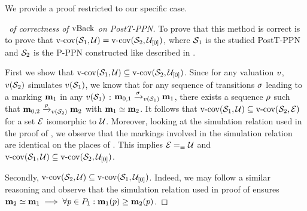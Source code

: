 We provide a proof restricted to our specific case.

\begin{proof}[\proofname\ of correctness of $\vback$ on PostT-PPN]
  To prove that this method is correct is to prove that $\vcov{\namePPN[1]}{\ucs} = \vcov{\namePPN[2]}{\ucse}$,
  where $\namePPN[1]$ is the studied PostT-PPN and $\namePPN[2]$ is the P-PPN constructed like described in .

  First we show that $\vcov{\namePPN[1]}{\ucs} \subseteq \vcov{\namePPN[2]}{\ucse}$.
  Since
  for any valuation $\val$,
  $\val[{\namePPN[2]}]$ simulates $\val[{\namePPN[1]}]$,
  we know that
  for any sequence of transitions $\seqt[1]$
  leading to a marking $\mar_1$ in any $\val[{\namePPN[1]}]$
  :
  $\mar_{0,1} \fire[{\val[{\namePPN[1]}]}]{\seqt[1]} \mar_1$,
  there exists a sequence $\seqt[2]$
  such that
  $\mar_{0,2} \fire[{\val[{\namePPN[2]}]}]{\seqt[2]} \mar_2$
  with $\mar_1 \simeq \mar_2$.
  It follows that $\vcov{\namePPN[1]}{\ucs} \subseteq \vcov{\namePPN[2]}{\set}$ for a set $\set$ isomorphic to $\ucs$.
  Moreover, looking at the simulation relation used in the proof of , we observe that the markings involved in the simulation relation are identical on the places of \namePPN[1].
  This implies $\set =_\equiv \ucs$
  and $\vcov{\namePPN[1]}{\ucs} \subseteq \vcov{\namePPN[2]}{\ucse}$.

  Secondly, $\vcov{\namePPN[2]}{\ucs} \subseteq \vcov{\namePPN[1]}{\ucse}$.
  Indeed,
  we may follow a similar reasoning and observe that
  the simulation relation used in proof of  ensures
  $\mar_2 \simeq \mar_1 \implies \forall p \in \places_1 : \mar_1(p) \geq \mar_2(p)$.
\end{proof}

%
